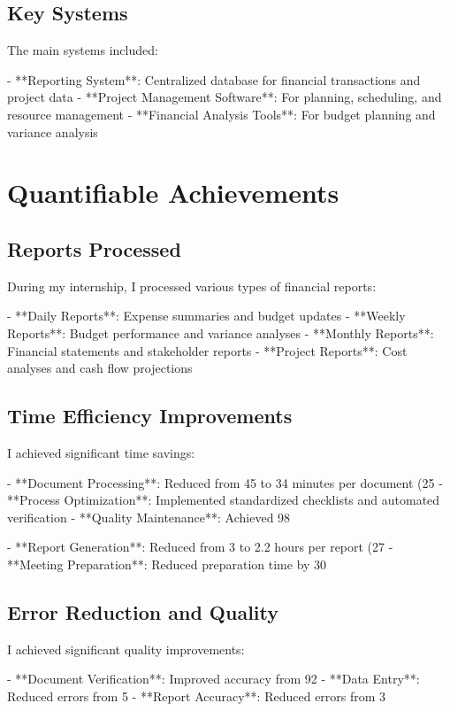 \subsection{Key Systems}
The main systems included:

- **Reporting System**: Centralized database for financial transactions and project data
- **Project Management Software**: For planning, scheduling, and resource management
- **Financial Analysis Tools**: For budget planning and variance analysis

\section{Quantifiable Achievements}

\subsection{Reports Processed}
During my internship, I processed various types of financial reports:

- **Daily Reports**: Expense summaries and budget updates
- **Weekly Reports**: Budget performance and variance analyses
- **Monthly Reports**: Financial statements and stakeholder reports
- **Project Reports**: Cost analyses and cash flow projections

\subsection{Time Efficiency Improvements}
I achieved significant time savings:

- **Document Processing**: Reduced from 45 to 34 minutes per document (25%
- **Process Optimization**: Implemented standardized checklists and automated verification
- **Quality Maintenance**: Achieved 98%

- **Report Generation**: Reduced from 3 to 2.2 hours per report (27%
- **Meeting Preparation**: Reduced preparation time by 30%

\subsection{Error Reduction and Quality}
I achieved significant quality improvements:

- **Document Verification**: Improved accuracy from 92%
- **Data Entry**: Reduced errors from 5%
- **Report Accuracy**: Reduced errors from 3%

